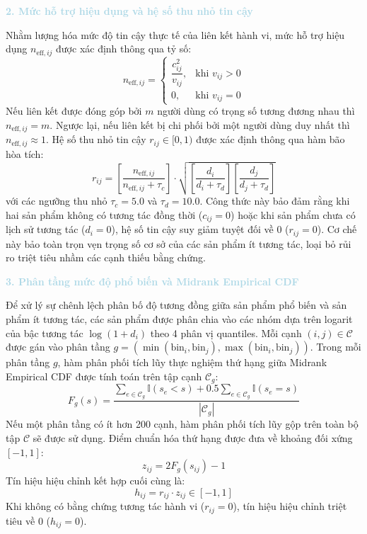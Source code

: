 \noindent\textcolor{lightblue}{\textbf{2. Mức hỗ trợ hiệu dụng và hệ số thu nhỏ tin cậy}}

Nhằm lượng hóa mức độ tin cậy thực tế của liên kết hành vi, mức hỗ trợ hiệu dụng $n_{\text{eff}, ij}$ được xác định thông qua tỷ số:
\begin{equation}
n_{\text{eff}, ij} = \begin{cases}
\dfrac{c_{ij}^2}{v_{ij}}, & \text{khi } v_{ij} > 0 \\[8pt]
0, & \text{khi } v_{ij} = 0
\end{cases}
\end{equation}
Nếu liên kết được đóng góp bởi $m$ người dùng có trọng số tương đương nhau thì $n_{\text{eff}, ij} = m$. Ngược lại, nếu liên kết bị chi phối bởi một người dùng duy nhất thì $n_{\text{eff}, ij} \approx 1$. Hệ số thu nhỏ tin cậy $r_{ij} \in [0, 1)$ được xác định thông qua hàm bão hòa tích:
\begin{equation}
r_{ij} = \left[ \frac{n_{\text{eff}, ij}}{n_{\text{eff}, ij} + \tau_c} \right] \cdot \sqrt{\left[ \frac{d_i}{d_i + \tau_d} \right] \left[ \frac{d_j}{d_j + \tau_d} \right]}
\end{equation}
với các ngưỡng thu nhỏ $\tau_c = 5.0$ và $\tau_d = 10.0$. Công thức này bảo đảm rằng khi hai sản phẩm không có tương tác đồng thời ($c_{ij} = 0$) hoặc khi sản phẩm chưa có lịch sử tương tác ($d_i = 0$), hệ số tin cậy suy giảm tuyệt đối về 0 ($r_{ij} = 0$). Cơ chế này bảo toàn trọn vẹn trọng số cơ sở của các sản phẩm ít tương tác, loại bỏ rủi ro triệt tiêu nhầm các cạnh thiếu bằng chứng.

\noindent\textcolor{lightblue}{\textbf{3. Phân tầng mức độ phổ biến và Midrank Empirical CDF}}

Để xử lý sự chênh lệch phân bố độ tương đồng giữa sản phẩm phổ biến và sản phẩm ít tương tác, các sản phẩm được phân chia vào các nhóm dựa trên logarit của bậc tương tác $\log(1 + d_i)$ theo 4 phân vị quantiles. Mỗi cạnh $(i, j) \in \mathcal{C}$ được gán vào phân tầng $g = (\min(\text{bin}_i, \text{bin}_j), \max(\text{bin}_i, \text{bin}_j))$. Trong mỗi phân tầng $g$, hàm phân phối tích lũy thực nghiệm thứ hạng giữa Midrank Empirical CDF được tính toán trên tập cạnh $\mathcal{C}_g$:
\begin{equation}
F_g(s) = \frac{\sum_{e \in \mathcal{C}_g} \mathbb{I}(s_e < s) + 0.5 \sum_{e \in \mathcal{C}_g} \mathbb{I}(s_e = s)}{|\mathcal{C}_g|}
\end{equation}
Nếu một phân tầng có ít hơn 200 cạnh, hàm phân phối tích lũy gộp trên toàn bộ tập $\mathcal{C}$ sẽ được sử dụng. Điểm chuẩn hóa thứ hạng được đưa về khoảng đối xứng $[-1, 1]$:
\begin{equation}
z_{ij} = 2 F_g(s_{ij}) - 1
\end{equation}
Tín hiệu hiệu chỉnh kết hợp cuối cùng là:
\begin{equation}
h_{ij} = r_{ij} \cdot z_{ij} \in [-1, 1]
\end{equation}
Khi không có bằng chứng tương tác hành vi ($r_{ij} = 0$), tín hiệu hiệu chỉnh triệt tiêu về 0 ($h_{ij} = 0$).

